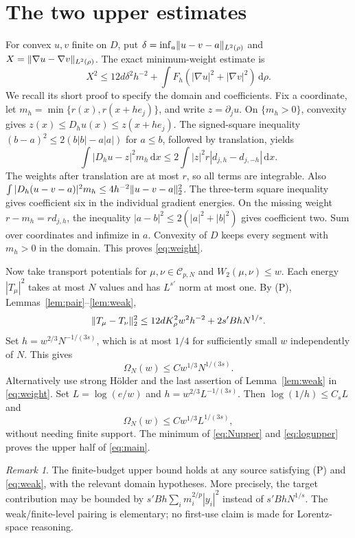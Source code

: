 \documentclass[11pt]{article}
\theoremstyle{remark}\newtheorem{remark}[theorem]{Remark}
\newcommand{\dd}{\,\mathrm d}\newcommand{\Ptwo}{\mathcal P_2}
\begin{document}
\section{The two upper estimates}
For convex $u,v$ finite on $D$, put
$\delta=\inf_a\lVert u-v-a\rVert_{L^2(\rho)}$ and
$X=\lVert\nabla u-\nabla v\rVert_{L^2(\rho)}$. The exact minimum-weight estimate is
\begin{equation}\label{eq:weight}
 X^2\le12d\delta^2h^{-2}
       +\int F_h(|\nabla u|^2+|\nabla v|^2)\dd\rho.
\end{equation}
We recall its short proof to specify the domain and coefficients. Fix a coordinate, let $m_h=\min\{r(x),r(x+he_j)\}$, and write $z=\partial_j u$. On $\{m_h>0\}$, convexity gives $z(x)\le D_hu(x)\le z(x+he_j)$. The signed-square inequality
$(b-a)^2\le2(b|b|-a|a|)$ for $a\le b$, followed by translation, yields
\[
 \int|D_hu-z|^2m_h\dd x
 \le2\int |z|^2r|d_{j,h}-d_{j,-h}|\dd x.
\]
The weights after translation are at most $r$, so all terms are integrable. Also
$\int|D_h(u-v-a)|^2m_h\le4h^{-2}\lVert u-v-a\rVert_2^2$.
The three-term square inequality gives coefficient six in the individual gradient energies. On the missing weight $r-m_h=rd_{j,h}$, the inequality $|a-b|^2\le2(|a|^2+|b|^2)$ gives coefficient two. Sum over coordinates and infimize in $a$. Convexity of $D$ keeps every segment with $m_h>0$ in the domain. This proves \eqref{eq:weight}.

Now take transport potentials for $\mu,\nu\in\mathcal C_{p,N}$ and $W_2(\mu,\nu)\le w$. Each energy $|T_\mu|^2$ takes at most $N$ values and has $L^{s'}$ norm at most one. By (P), Lemmas~\ref{lem:pair}--\ref{lem:weak},
\[
 \lVert T_\mu-T_\nu\rVert_2^2\le12dK_\rho^2w^2h^{-2}+2s'BhN^{1/s}.
\]
Set $h=w^{2/3}N^{-1/(3s)}$, which is at most $1/4$ for sufficiently small $w$ independently of $N$. This gives
\begin{equation}\label{eq:Nupper}
 \Omega_N(w)\le Cw^{1/3}N^{1/(3s)}.
\end{equation}
Alternatively use strong H\"older and the last assertion of Lemma~\ref{lem:weak} in \eqref{eq:weight}. Set $L=\log(e/w)$ and
$h=w^{2/3}L^{-1/(3s)}$. Then $\log(1/h)\le C_sL$ and
\begin{equation}\label{eq:logupper}
 \Omega_N(w)\le Cw^{1/3}L^{1/(3s)},
\end{equation}
without needing finite support. The minimum of \eqref{eq:Nupper} and \eqref{eq:logupper} proves the upper half of \eqref{eq:main}.

\begin{remark}
The finite-budget upper bound holds at any source satisfying (P) and \eqref{eq:weak}, with the relevant domain hypotheses. More precisely, the target contribution may be bounded by
$s'Bh\sum_i m_i^{2/p}|y_i|^2$ instead of $s'BhN^{1/s}$.
The weak/finite-level pairing is elementary; no first-use claim is made for Lorentz-space reasoning.
\end{remark}
\end{document}
